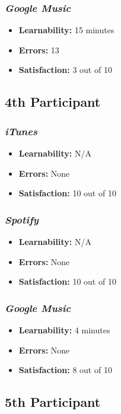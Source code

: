 \documentclass{article}
\begin{document}
{\begin{multicols}{2}
\subsubsection{\it Google Music}
\begin{itemize}
\item {\bf Learnability:} 15 minutes
	\item {\bf Errors:} 13
	\item {\bf Satisfaction:} 3 out of 10 
\end{itemize}

\subsection{4th Participant}

\subsubsection{\it iTunes}
\begin{itemize}
	\item {\bf Learnability:} N/A
	\item {\bf Errors:}  None
	\item {\bf Satisfaction:} 10 out of 10 
\end{itemize}

\subsubsection{\it Spotify}
\begin{itemize}
	\item {\bf Learnability:} N/A
	\item {\bf Errors:} None
	\item {\bf Satisfaction:} 10 out of 10 
\end{itemize}

\subsubsection{\it Google Music}
\begin{itemize}
\item {\bf Learnability:} 4 minutes
	\item {\bf Errors:} None
	\item {\bf Satisfaction:} 8 out of 10 
\end{itemize}

\subsection{5th Participant}


\end{multicols}}
\end{document}
